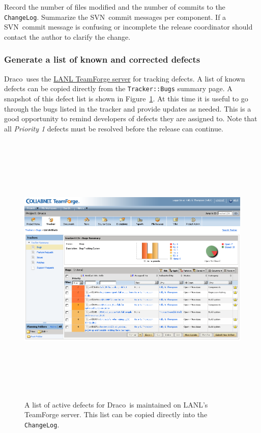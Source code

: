 \documentclass[note]{newmemo}
\newcommand{\draco}{{\normalfont\small\sffamily Draco}}
\newcommand{\svn}{\textsf{SVN}}
\begin{document}
Record the number of files modified and the number of commits to the
\texttt{ChangeLog}. Summarize the \svn\ commit messages per component.
If a \svn\ commit message is confusing or incomplete the release
coordinator should contact the author to clarify the change.


\subsubsection{Generate a list of known and corrected defects}
\label{sec:list_of_defects}

\draco\ uses the \href{https://tf.lanl.gov}{LANL TeamForge server} for
tracking defects.  A list of known defects can be copied directly from
the \texttt{Tracker::Bugs} summary page.  A snapshot of this defect
list is shown in Figure~\ref{fig:sample-bug-itemization-on-tf}. At
this time it is useful to go through the bugs listed in the tracker
and provide updates as needed.  This is a good opportunity to remind
developers of defects they are assigned to.  Note that all
\textit{Priority 1} defects must be resolved before the release can
continue.

\begin{figure}
  \centerline{ \includegraphics[height=5.25in, angle=90]
{sample-bug-itemization-on-tf.png}}
  \caption{A list of active defects for \draco\ is maintained on
    LANL's TeamForge server.  This list can be copied directly into
    the \texttt{ChangeLog}.}
  \label{fig:sample-bug-itemization-on-tf}
\end{figure}
\end{document}
